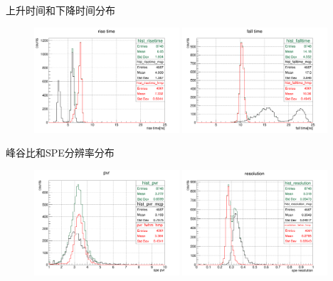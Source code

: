 \documentclass[11pt,compress,xcolor=x11names,UTF8]{beamer}
\begin{document}
\begin{frame}{上升时间和下降时间分布}
\begin{figure}
\centering
\includegraphics[width=0.48\textwidth]{risetime}
\includegraphics[width=0.48\textwidth]{falltime}
\end{figure}
\end{frame}
\begin{frame}{峰谷比和SPE分辨率分布}
\begin{figure}
\centering
\includegraphics[width=0.48\textwidth]{pvr}
\includegraphics[width=0.48\textwidth]{resolution}
\end{figure}
\end{frame}
\end{document}
